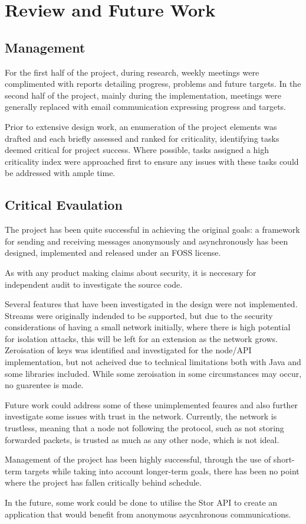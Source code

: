\section{Review and Future Work}

	\subsection{Management}
		For the first half of the project, during research, weekly meetings were complimented with reports detailing progress, problems and future targets. In the second half of the project, mainly during the implementation, meetings were generally replaced with email communication expressing progress and targets.
		
		Prior to extensive design work, an enumeration of the project elements was drafted and each briefly assessed and ranked for criticality, identifying tasks deemed critical for project success. Where possible, tasks assigned a high criticality index were approached first to ensure any issues with these tasks could be addressed with ample time.


	\subsection{Critical Evaulation}
		The project has been quite successful in achieving the original goals: a framework for sending and receiving messages anonymously and asynchronously has been designed, implemented and released under an FOSS license. 
		
		As with any product making claims about security, it is neccesary for independent audit to investigate the source code. 
		
		Several features that have been investigated in the design were not implemented. Streams were originally indended to be supported, but due to the security considerations of having a small network initially, where there is high potential for isolation attacks, this will be left for an extension as the network grows. Zeroisation of keys was identified and investigated for the node/API implementation, but not acheived due to technical limitations both with Java and some libraries included. While some zeroisation in some circumstances may occur, no guarentee is made.
		
		Future work could address some of these unimplemented feaures and also further investigate some issues with trust in the network. Currently, the network is trustless, meaning that a node not following the protocol, such as not storing forwarded packets, is trusted as much as any other node, which is not ideal.
		
		Management of the project has been highly successful, through the use of short-term targets while taking into account longer-term goals, there has been no point where the project has fallen critically behind schedule.

		In the future, some work could be done to utilise the Stor API to create an application that would benefit from anonymous asycnhronous communications.
